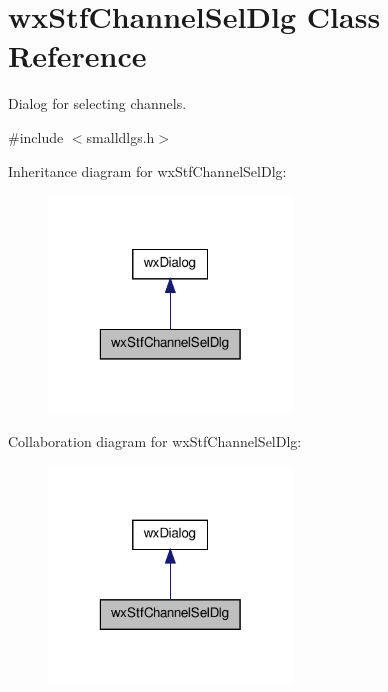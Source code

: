 \hypertarget{classwxStfChannelSelDlg}{
\section{wxStfChannelSelDlg Class Reference}
\label{classwxStfChannelSelDlg}
}


Dialog for selecting channels.  




{\ttfamily \#include $<$smalldlgs.h$>$}



Inheritance diagram for wxStfChannelSelDlg:
\nopagebreak
\begin{figure}[H]
\begin{center}
\leavevmode
\includegraphics[width=184pt]{classwxStfChannelSelDlg__inherit__graph}
\end{center}
\end{figure}


Collaboration diagram for wxStfChannelSelDlg:
\nopagebreak
\begin{figure}[H]
\begin{center}
\leavevmode
\includegraphics[width=184pt]{classwxStfChannelSelDlg__coll__graph}
\end{center}
\end{figure}
